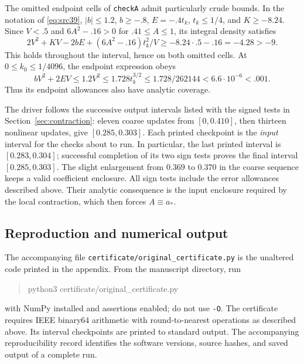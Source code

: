 \documentclass[11pt,a4paper]{article}
\numberwithin{equation}{section}
\theoremstyle{definition}
\theoremstyle{remark}
\begin{document}
The omitted endpoint cells of \texttt{checkA} admit particularly crude
bounds.  In the notation of \eqref{eq:src39}, $|b|\le1.2$, $b\ge-.8$,
$E=-.4t_k$, $t_k\le1/4$, and $K\ge-8.24$.  Since $V<.5$ and
$6A^2-.16>0$ for $.41\le A\le1$, its integral density satisfies
\[
 2V^2+KV-2bE+(6A^2-.16)t_k^2/V
 \ge-8.24\cdot.5-.16=-4.28>-9.
\]
This holds throughout the interval, hence on both omitted cells.  At
$0\le k_0\le1/4096$, the endpoint expression obeys
\[
 bV^2+2EV\le1.2V^2\le1.728t_k^{3/2}
 \le1.728/262144<6.6\cdot10^{-6}<.001.
\]
Thus its endpoint allowances also have analytic coverage.

The driver follows the successive output intervals listed with the
signed tests in Section~\ref{sec:contraction}: eleven coarse updates
from $[0,0.410]$, then thirteen nonlinear updates, give
$[0.285,0.303]$.  Each printed checkpoint is the \emph{input} interval
for the checks about to run.  In particular, the last printed interval
is $[0.283,0.304]$; successful completion of its two sign tests proves
the final interval $[0.285,0.303]$.  The slight enlargement from
$0.369$ to $0.370$ in the coarse sequence keeps a valid
coefficient enclosure.  All sign tests include the error allowances described
above.  Their analytic consequence is the input enclosure required
by the local contraction, which then forces $A\equiv a_*$.

\subsection{Reproduction and numerical output}\label{cert:execution}

The accompanying file \texttt{certificate/original\_certificate.py} is the
unaltered code printed in the appendix.  From the manuscript directory,
run
\begin{quote}\ttfamily
python3 certificate/original\_certificate.py
\end{quote}
with NumPy installed and assertions enabled; do not use \texttt{-O}.
The certificate requires IEEE binary64 arithmetic with round-to-nearest
operations as described above.  Its interval checkpoints are printed to
standard output.  The accompanying reproducibility record identifies the
software versions, source hashes, and saved output of a complete run.
\end{document}
